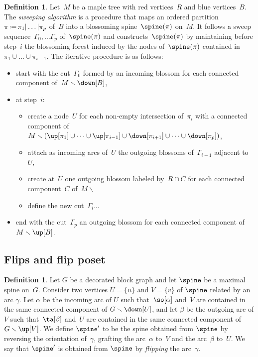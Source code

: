 \documentclass{amsart}
\theoremstyle{definition}
\newtheorem{definition}[theorem]{Definition}
\newcommand{\ssm}{\smallsetminus} %
\newcommand{\eqdef}{\mbox{\,\raisebox{0.2ex}{\scriptsize\ensuremath{\mathrm:}}\ensuremath{=}\,}} %
\newcommand{\darkblue}{\color{darkblue}} %
\newcommand{\defn}[1]{\textsl{\darkblue #1}} %
\newcommand{\vincent}[1]{\todo[color=blue!30]{#1 \\ \hfill --- V.}}
\begin{document}
\begin{definition}
  \label{def:sweepingAlgorithm}
  Let~$M$ be a maple tree with red vertices~$R$ and blue vertices~$B$.
  The \defn{sweeping algorithm} is a procedure that maps an ordered partition~$\pi \eqdef \pi_1 | \dots | \pi_p$ of~$B$ into a blossoming spine~$\spine(\pi)$ on~$M$.
  It follows a sweep sequence~$\Gamma_0, \dots \Gamma_p$ of~$\spine(\pi)$ and constructs~$\spine(\pi)$ by maintaining before step~$i$ the blossoming forest induced by the nodes of~$\spine(\pi)$ contained in~$\pi_1 \cup \dots \cup \pi_{i-1}$.
  The iterative procedure is as follows:
  \begin{itemize}
    \item start with the cut~$\Gamma_0$ formed by an incoming blossom for each connected component of~$M \ssm \down[B]$,
    \item at step~$i$:
      \begin{itemize}
        \item create a node~$U$ for each non-empty intersection of~$\pi_i$ with a connected component of~$M \ssm (\up[\pi_1] \cup \dots \cup \up[\pi_{i-1}] \cup \down[\pi_{i+1}] \cup \dots \cup \down[\pi_p])$,
        \item attach as incoming arcs of~$U$ the outgoing blossoms of~$\Gamma_{i-1}$ adjacent to~$U$,
        \item create at~$U$ one outgoing blossom labeled by~$R \cap C$ for each connected component~$C$ of~$M \ssm $ 
        \item define the new cut~$\Gamma_i$...
      \end{itemize}
    \item end with the cut~$\Gamma_p$ an outgoing blossom for each connected component of~$M \ssm \up[B]$.
  \end{itemize}
  \vincent{improve that}
\end{definition}







\subsection{Flips and flip poset}

\begin{definition}
Let $G$ be a decorated block graph and let $\spine$ be a maximal spine on~$G$.
Consider two vertices $U = \{u\}$ and $V = \{v\}$ of $\spine$ related by an arc $\gamma$. 
Let $\alpha$ be the incoming arc of $U$ such that~$\so[\alpha]$ and~$V$ are contained in the same connected component of $G \ssm \down[U]$, and let $\beta$ be the outgoing arc of $V$ such that~$\ta[\beta]$ and~$U$ are contained in the same connected component of $G \ssm \up[V]$.
We define $\spine'$ to be the spine obtained from $\spine$ by reversing the orientation of~$\gamma$, grafting the arc~$\alpha$ to~$V$ and the arc~$\beta$ to~$U$.
We say that $\spine'$ is obtained from $\spine$ by \defn{flipping} the arc~$\gamma$. 
\end{definition}
\end{document}
